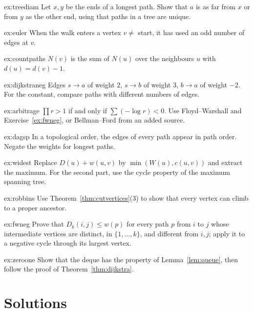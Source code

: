 \begin{hint}{ex:treediam}
Let $x,y$ be the ends of a longest path. Show that $a$ is as far from $x$ or from $y$ as the other end, using that paths in a tree are unique.
\end{hint}
\begin{hint}{ex:euler}
When the walk enters a vertex $v\ne$ start, it has used an odd number of edges at $v$.
\end{hint}
\begin{hint}{ex:countpaths}
$N(v)$ is the sum of $N(u)$ over the neighbours $u$ with $d(u)=d(v)-1$.
\end{hint}
\begin{hint}{ex:dijkstraneg}
Edges $s\to a$ of weight $2$, $s\to b$ of weight $3$, $b\to a$ of weight $-2$. For the constant, compare paths with different numbers of edges.
\end{hint}
\begin{hint}{ex:arbitrage}
$\prod r>1$ if and only if $\sum(-\log r)<0$. Use Floyd--Warshall and Exercise~\ref{ex:fwneg}, or Bellman--Ford from an added source.
\end{hint}
\begin{hint}{ex:dagsp}
In a topological order, the edges of every path appear in path order. Negate the weights for longest paths.
\end{hint}
\begin{hint}{ex:widest}
Replace $D(u)+w(u,v)$ by $\min(W(u),c(u,v))$ and extract the maximum. For the second part, use the cycle property of the maximum spanning tree.
\end{hint}
\begin{hint}{ex:robbins}
Use Theorem~\ref{thm:cutvertices}(3) to show that every vertex can climb to a proper ancestor.
\end{hint}
\begin{hint}{ex:fwneg}
Prove that $D_k(i,j)\le w(p)$ for every path $p$ from $i$ to $j$ whose intermediate vertices are distinct, in $\{1,\dots,k\}$, and different from $i,j$; apply it to a negative cycle through its largest vertex.
\end{hint}
\begin{hint}{ex:zeroone}
Show that the deque has the property of Lemma~\ref{lem:queue}, then follow the proof of Theorem~\ref{thm:dijkstra}.
\end{hint}

\section{Solutions}

